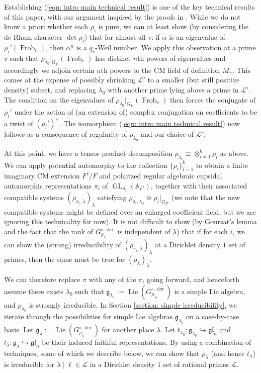 \documentclass{amsart}
\theoremstyle{definition}
\numberwithin{equation}{section} %
\newcommand{\GL}{\operatorname{GL}}
\newcommand{\Lie}{\operatorname{Lie}}
\newcommand{\der}{\operatorname{der}}
\newcommand{\Frob}{\operatorname{Frob}}
\newcommand{\bb}[1]{\mathbb{#1}}
\newcommand{\mc}[1]{\mathcal{#1}}
\newcommand{\mf}[1]{\mathfrak{#1}}
\begin{document}
Establishing (\ref{eqn: intro main technical result}) is one of the key technical results of this paper, with our argument inspired by the proofs in \cite[\S7]{Xia19}.
While we do not know a priori whether each $\rho_i$ is pure, we can at least show (by considering the de Rham character $\det \rho_i$) that for almost all \( v \): if $\alpha$ is an eigenvalue of $\rho_i'(\Frob_v)$, then $\alpha^n$ is a $q_v$-Weil number. We apply this observation at a prime $v$ such that $\rho_{\lambda_0}|_{G_E}(\Frob_v)$ has distinct $n$th powers of eigenvalues and accordingly we adjoin certain $n$th powers to the CM field of definition $M_\pi$. This comes at the expense of possibly shrinking $\mc{L}'$ to a smaller (but still positive density) subset, and replacing $\lambda_0$ with another prime lying above a prime in $\mc{L}'$. The condition on the eigenvalues of $\rho_{\lambda_0}|_{G_E}(\Frob_v)$ then forces the conjugate of $\rho_i'$ under the action of (an extension of) complex conjugation on coefficients to be a twist of $(\rho_i')^\vee$. The isomorphism (\ref{eqn: intro main technical result}) now follows as a consequence of regularity of $\rho_{\lambda_0}$ and our choice of $\mc{L}'$.

At this point, we have a tensor product decomposition \( \rho_{\lambda_0}\cong\otimes_{i=1}^k\rho_i \) as above. We can apply potential automorphy to the collection \( \{ \rho_i \}_{i=1}^k \) to obtain a finite imaginary CM extension \( F'/F \) and polarized regular algebraic cupsidal automorphic representations \( \pi_i \) of \( \GL_{n_i}(\bb{A}_{F'}) \), together with their associated compatible systems \( (\rho_{\pi_i,\lambda})_\lambda \) satisfying \( \rho_{\pi_i,\lambda_0}\cong \rho_i|_{G_{F'}} \) (we note that the new compatible systems might be defined over an enlarged coefficient field, but we are ignoring this technicality for now). It is not difficult to show (by Goursat's lemma and the fact that the rank of \( G_{\rho_\lambda}^{\circ,\der} \) is independent of \( \lambda \)) that if for each \( i \), we can show the (strong) irreducibility of \( (\rho_{\pi_i,\lambda})_\lambda \) at a Dirichlet density \( 1 \) set of primes, then the same must be true for \( (\rho_\lambda)_\lambda \). 

We can therefore replace \( \pi \) with any of the \( \pi_i \) going forward, and henceforth assume there exists \( \lambda_0 \) such that \( \mf{g}_{\lambda_0} := \Lie(G_{\rho_{\lambda_0}}^{\circ,\der}) \) is a simple Lie algebra, and \( \rho_{\lambda_0} \) is strongly irreducible. In Section \ref{section: simple irreducibility}, we iterate through the possibilities for simple Lie algebras \( \mf{g}_{\lambda_0} \) on a case-by-case basis. Let \( \mf{g}_\lambda := \Lie(G_{\rho_{\lambda}}^{\circ,\der}) \) for another place \( \lambda \). Let \( t_{\lambda_0}: \mf{g}_{\lambda_0}\hookrightarrow \mf{gl}_n \) and \( t_{\lambda}:\mf{g}_{\lambda}\hookrightarrow \mf{gl}_n \) be their induced faithful representations. By using a combination of techniques, some of which we describe below, we can show that $\rho_\lambda$ (and hence \( t_{\lambda} \)) is irreducible for \( \lambda\mid\ell\in\mc{L} \) in a Dirichlet density \( 1 \) set of rational primes \( \mc{L} \).
\end{document}
